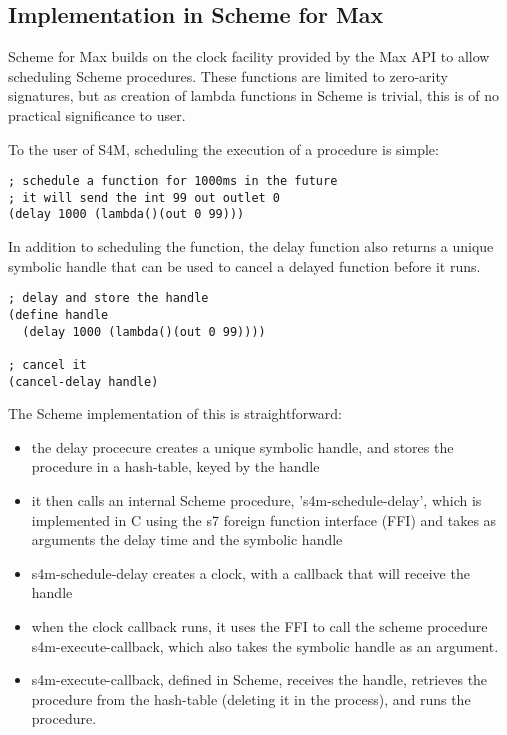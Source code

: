 \documentclass[acmsmall]{acmart}
\begin{document}
{\subsection{Implementation in Scheme for Max}

Scheme for Max builds on the clock facility provided by the Max API to allow scheduling
Scheme procedures. These functions are limited to zero-arity signatures, but as
creation of lambda functions in Scheme is trivial, this is of no practical significance to 
user.  

To the user of S4M, scheduling the execution of a procedure is simple:

\begin{verbatim}
; schedule a function for 1000ms in the future
; it will send the int 99 out outlet 0
(delay 1000 (lambda()(out 0 99)))
\end{verbatim}

In addition to scheduling the function, the delay function also returns a unique
symbolic handle that can be used to cancel a delayed function before it runs.

\begin{verbatim}
; delay and store the handle
(define handle 
  (delay 1000 (lambda()(out 0 99))))

; cancel it
(cancel-delay handle)
\end{verbatim}

The Scheme implementation of this is straightforward:
\begin{itemize}
\item the delay procecure creates a unique symbolic handle, and stores the procedure
  in a hash-table, keyed by the handle
\item it then calls an internal Scheme procedure, 's4m-schedule-delay', which is implemented
  in C using the s7 foreign function interface (FFI) and takes as arguments
  the delay time and the symbolic handle
\item s4m-schedule-delay creates a clock, with a callback that will receive the handle
\item when the clock callback runs, it uses the FFI to call the scheme procedure s4m-execute-callback,
  which also takes the symbolic handle as an argument.
\item s4m-execute-callback, defined in Scheme, receives the handle, retrieves the procedure
  from the hash-table (deleting it in the process), and runs the procedure.
\end{itemize}

}
\end{document}
